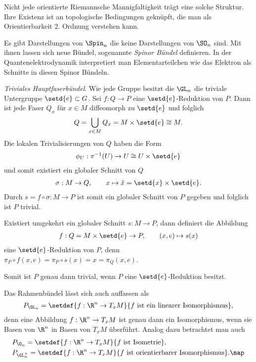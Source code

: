 \documentclass[%
	paper=a5,%
	fleqn,%
	DIV=18,%
	BCOR=0mm,
	fontsize=11pt,
	titlepage=false,%
	bibliography=totoc,
	DIV=18,%
	twoside=true,
	pdftitle=Riemannsche Geometrie,
	pdfauthor=Uwe Semmelmann,
	numbers=noendperiod]%
	{scrbook}
\begin{document}
\begin{ex}
\begin{exenum}
Nicht jede orientierte Riemannsche Mannigfaltigkeit trägt eine solche
Struktur. Ihre Existenz ist an topologische Bedingungen geknüpft, die man
als Orientierbarkeit 2. Ordnung verstehen kann.

Es gibt Darstellungen von $\Spin_n$ die keine Darstellungen von $\SO_n$ sind.
Mit ihnen lassen sich neue Bündel, sogenannte \emph{Spinor Bündel} definieren.
In der Quantenelektrodynamik interpretiert man Elementarteilchen wie das
Elektron als Schnitte in diesen Spinor Bündeln.
\item \textit{Triviales Hauptfaserbündel}.
Wie jede Gruppe besitzt die $\GL_n$ die triviale Untergruppe
$\setd{e}\subset G$. Sei $f: Q\to P$ eine $\setd{e}$-Reduktion von $P$. Dann
ist jede Faser $Q_x$ für $x\in M$ diffeomorph zu $\setd{e}$ und folglich
\begin{align*}
Q = \bigcup_{x\in M} Q_x = M\times \setd{e}\cong M. 
\end{align*} 
Die lokalen Trivialisierungen von $Q$ haben die Form
\begin{align*}
\phi_U : \pi^{-1}(U) \to U\cong U\times\setd{e}
\end{align*}
und somit existiert ein globaler Schnitt von $Q$
\begin{align*}
\sigma : M\to Q,\qquad x\mapsto \hat{x} = \setd{x}\times\setd{e}.
\end{align*}
Durch $s = f\circ \sigma: M\to P$ ist somit ein globaler Schnitt von $P$ gegeben
und folglich ist $P$ trivial.

Existiert umgekehrt ein globaler Schnitt $s: M\to P$, dann definiert die
Abbildung
\begin{align*}
f: Q=M\times\setd{e}\to P,\qquad (x,e)\mapsto s(x)
\end{align*}
eine $\setd{e}$-Reduktion von $P$, denn $\pi_P\circ f(x,e) = \pi_P\circ s(x) = x
= \pi_Q(x,e)$.

Somit ist $P$ genau dann trivial, wenn $P$ eine $\setd{e}$-Reduktion
besitzt.\boxc
\end{exenum}
\end{ex}

\begin{rem}
Das Rahmenbündel lässt sich auch auffassen als
\begin{align*}
P_{\GL_n} = \setdef{f: \R^n\to T_x M}{f \text{ ist ein linearer Isomorphismus}},
\end{align*}
denn eine Abbildung $f: \R^n\to T_xM$ ist genau dann ein Isomorphismus, wenn sie
Basen von $\R^n$ in Basen von $T_xM$ überführt.
Analog dazu betrachtet man auch
\begin{align*}
&P_{\O_n} = \setdef{f: \R^n\to T_x M}{f\text{ ist Isometrie}},\\
&P_{\GL_n^+} = \setdef{f: \R^n\to T_x M}{f\text{ ist orientierbarer
Isomorphismus}}.\map
\end{align*} 
\end{rem}
\end{document}
